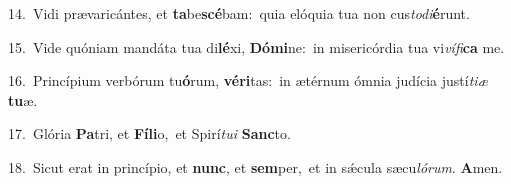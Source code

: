 {\numbfont\textcolor{\numbcolor}{14.}}~Vidi prævaricántes, et \textbf{ta}\-be\-\textbf{scé}\-bam:~\star quia elóquia tua non cus\-\textit{to}\-\textit{di}\textbf{é}runt.\par
{\numbfont\textcolor{\numbcolor}{15.}}~Vide quóniam mandáta tua di\-\textbf{lé}\-xi, \textbf{Dó}\-\textbf{mi}ne:~\star in misericórdia tua vi\-\textit{ví}\-\textit{fi}\textbf{ca} me.\par
{\numbfont\textcolor{\numbcolor}{16.}}~Princípium verbórum tu\-\textbf{ó}\-rum, \textbf{vé}\-\textbf{ri}tas:~\star in ætérnum ómnia judícia justí\-\textit{ti}\-\textit{æ} \textbf{tu}\-æ.\par
{\numbfont\textcolor{\numbcolor}{17.}}~Glória \textbf{Pa}\-tri, et \textbf{Fí}\-\textbf{li}o,~\star et Spirí\-\textit{tu}\-\textit{i} \textbf{Sanc}\-to.\par
{\numbfont\textcolor{\numbcolor}{18.}}~Sicut erat in princípio, et \textbf{nunc}\-, et \textbf{sem}\-per,~\star et in sǽcula sæcu\-\textit{ló}\-\textit{rum}. \textbf{A}\-men.\par

